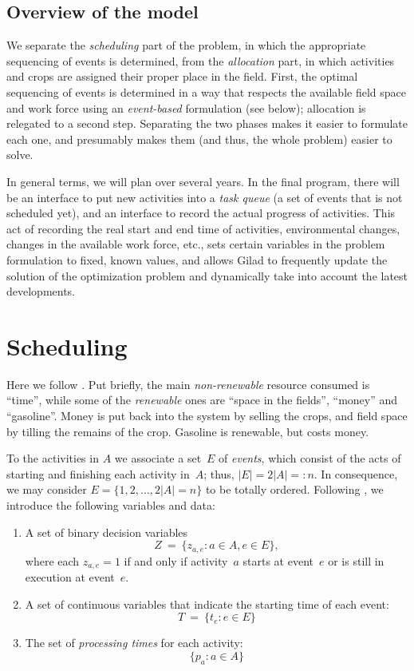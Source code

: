 \documentclass[11pt,reqno]{amsart}
\numberwithin{equation}{section}
\begin{document}
\subsection{Overview of the model}


We separate the \emph{scheduling} part of the problem, in which the
appropriate sequencing of events is determined, from the
\emph{allocation} part, in which activities and crops are assigned
their proper place in the field. First, the optimal sequencing of
events is determined in a way that respects the available field space
and work force using an \emph{event-based} formulation (see below);
allocation is relegated to a second step. Separating the two phases
makes it easier to formulate each one, and presumably makes them (and
thus, the whole problem) easier to solve.

In general terms, we will plan over several years. In the final
program, there will be an interface to put new activities into a
\emph{task queue} (a set of events that is not scheduled yet), and an
interface to record the actual progress of activities. This act of
recording the real start and end time of activities, environmental
changes, changes in the available work force, etc., sets certain
variables in the problem formulation to fixed, known values, and
allows Gilad to frequently update the solution of the optimization
problem and dynamically take into account the latest developments.


\section{Scheduling}

Here we follow \cite{artigues-etal11}. Put briefly, the main
\emph{non-renewable} resource consumed is ``time'', while some of the
\emph{renewable} ones are ``space in the fields'', ``money'' and
``gasoline''. Money is put back into the system by selling the crops,
and field space by tilling the remains of the crop. Gasoline is
renewable, but costs money.

To the activities in $A$ we associate a set~$E$ of \emph{events},
which consist of the acts of starting and finishing each activity
in~$A$; thus, $|E|=2|A|=:n$. In consequence, we may consider
$E=\{1,2,\dots, 2|A|=n\}$ to be totally ordered.  Following
\cite{artigues-etal11}, we introduce the following variables and data:

\begin{enumerate}
\item A set of binary decision variables 
  \[
     Z
     \ = \
     \big\{z_{a,e}: a\in A, e\in E\big\},
  \]
  where each $z_{a,e}=1$ if and only if activity~$a$ starts at
  event~$e$ or is still in execution at event~$e$.

\smallskip
\item A set of continuous variables that indicate the starting time of each event:
  \[
     T
     \ = \
     \big\{t_e : e\in E\big\}
  \]

\smallskip
\item The set of \emph{processing times} for each activity:
  \[
      \{p_a:a\in A\}
  \]  
\end{enumerate}
\end{document}
